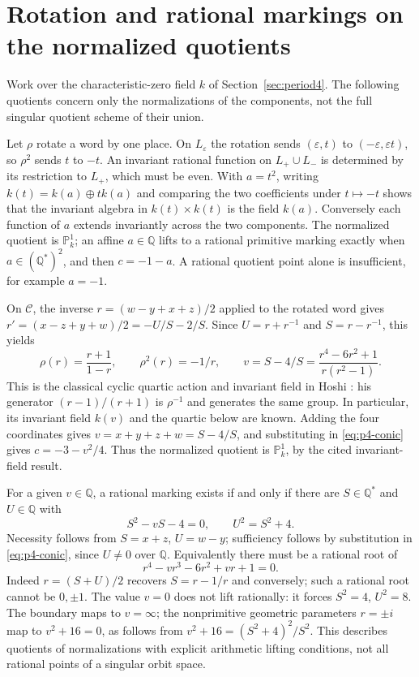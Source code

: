 \documentclass{jT}
\newcommand{\Q}{\mathbb Q}
\newcommand{\PP}{\mathbb P}
\begin{document}
\section{Rotation and rational markings on the normalized quotients}\label{sec:quotients}
Work over the characteristic-zero field $k$ of Section~\ref{sec:period4}. The following quotients concern only the normalizations of the components, not the full singular quotient scheme of their union.

Let $\rho$ rotate a word by one place. On $L_\varepsilon$ the rotation sends $(\varepsilon,t)$ to $(-\varepsilon,\varepsilon t)$, so $\rho^2$ sends $t$ to $-t$. An invariant rational function on $L_+\cup L_-$ is determined by its restriction to $L_+$, which must be even. With $a=t^2$, writing $k(t)=k(a)\oplus t k(a)$ and comparing the two coefficients under $t\mapsto-t$ shows that the invariant algebra in $k(t)\times k(t)$ is the field $k(a)$. Conversely each function of $a$ extends invariantly across the two components. The normalized quotient is $\PP^1_k$; an affine $a\in\Q$ lifts to a rational primitive marking exactly when $a\in(\Q^*)^2$, and then $c=-1-a$. A rational quotient point alone is insufficient, for example $a=-1$.

On $\mathcal C$, the inverse $r=(w-y+x+z)/2$ applied to the rotated word gives $r'=(x-z+y+w)/2=-U/S-2/S$. Since $U=r+r^{-1}$ and $S=r-r^{-1}$, this yields
\[
\rho(r)=\frac{r+1}{1-r},\qquad \rho^2(r)=-1/r,\qquad
v=S-4/S=\frac{r^4-6r^2+1}{r(r^2-1)}.
\]
This is the classical cyclic quartic action and invariant field in Hoshi \cite[\S3, p.~7]{hoshi}: his generator $(r-1)/(r+1)$ is $\rho^{-1}$ and generates the same group. In particular, its invariant field $k(v)$ and the quartic below are known. Adding the four coordinates gives $v=x+y+z+w=S-4/S$, and substituting in \eqref{eq:p4-conic} gives $c=-3-v^2/4$. Thus the normalized quotient is $\PP^1_k$, by the cited invariant-field result.

For a given $v\in\Q$, a rational marking exists if and only if there are $S\in\Q^*$ and $U\in\Q$ with
\[
S^2-vS-4=0,\qquad U^2=S^2+4.
\]
Necessity follows from $S=x+z$, $U=w-y$; sufficiency follows by substitution in \eqref{eq:p4-conic}, since $U\ne0$ over $\Q$. Equivalently there must be a rational root of
\[
r^4-vr^3-6r^2+vr+1=0.
\]
Indeed $r=(S+U)/2$ recovers $S=r-1/r$ and conversely; such a rational root cannot be $0,\pm1$. The value $v=0$ does not lift rationally: it forces $S^2=4$, $U^2=8$. The boundary maps to $v=\infty$; the nonprimitive geometric parameters $r=\pm i$ map to $v^2+16=0$, as follows from $v^2+16=(S^2+4)^2/S^2$. This describes quotients of normalizations with explicit arithmetic lifting conditions, not all rational points of a singular orbit space.
\end{document}
